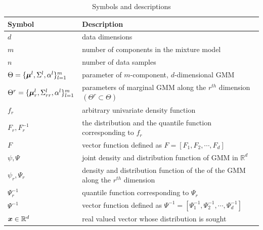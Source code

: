 \documentclass{article}
\begin{document}
\begin{table}[h]

\caption{Symbols and descriptions}

\label{tab:symbol_glossary}

\begin{tabular}{ll}

\hline

\textbf{Symbol} & \textbf{Description} \\

\hline

$d$ & data dimensions \\

$m$ & number of components in the mixture model \\

$n$ & number of data samples \\

$\Theta = \{\boldsymbol{\mu}^l, \Sigma^l, \alpha^l\}_{l=1}^m$ & parameter of $m$-component, $d$-dimensional GMM \\

$\Theta^r= \{\boldsymbol{\mu}_r^l, \Sigma_{rr}^l, \alpha^l\}_{l=1}^m$ & parameters of marginal GMM along the $r^{th}$ dimension $(\Theta^r \subset \Theta)$ \\

$f_r $ & arbitrary univariate density function \\

$F_r, F_r^{-1}$ & the distribution and the quantile function corresponding to $f_r$ \\

$F$ & vector function defined as $F = [F_1, F_2,\cdots,F_d]$ \\

$\psi, \Psi$ & joint density and distribution function of GMM in $\mathbb{R}^d$ \\

$\psi_r , \Psi_r$ & density and distribution function of the of the GMM along the $r^{th}$ dimension \\

$\Psi_r^{-1}$ & quantile function corresponding to $\Psi_r$ \\

$\Psi^{-1}$ & vector function defined as $\Psi^{-1} = [\Psi_1^{-1}, \Psi_2^{-1},\cdots,\Psi_d^{-1}]$ \\

$\boldsymbol{x} \in \mathbb{R}^d$ & real valued vector whose distribution is sought \\


\end{tabular}
\end{table}
\end{document}
